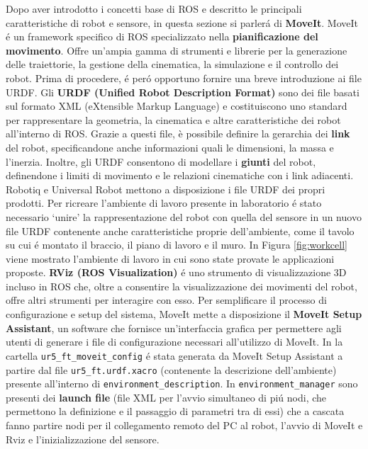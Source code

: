 Dopo aver introdotto i concetti base di ROS e descritto le principali caratteristiche di robot e sensore, in questa sezione si 
parler\'{a} di \textbf{MoveIt}. 
MoveIt \'{e} un framework specifico di ROS specializzato nella \textbf{pianificazione del movimento}. Offre un'ampia gamma 
di strumenti e librerie per la generazione delle traiettorie, la gestione della cinematica, la simulazione e il controllo 
dei robot. 
Prima di procedere, \'{e} per\'{o} opportuno fornire una breve introduzione ai file URDF.
Gli \textbf{URDF (Unified Robot Description Format)} sono dei file basati sul formato XML (eXtensible Markup Language) e 
costituiscono uno standard per rappresentare la geometria, la cinematica e altre caratteristiche dei robot all'interno di ROS. 
Grazie a questi file, è possibile definire la gerarchia dei \textbf{link} del robot, specificandone anche informazioni quali  
le dimensioni, la massa e l'inerzia. Inoltre, gli URDF consentono di modellare i \textbf{giunti}
del robot, definendone i limiti di movimento e le relazioni cinematiche con i link adiacenti. 
Robotiq e Universal Robot mettono a disposizione i file URDF dei propri prodotti. Per ricreare l'ambiente di lavoro presente in 
laboratorio \'{e} stato necessario `unire' la rappresentazione del robot con quella del sensore in un nuovo file URDF contenente 
anche caratteristiche proprie dell'ambiente, come il tavolo su cui \'{e} montato il braccio, il piano di lavoro e il muro. 
In Figura \ref{fig:workcell} viene mostrato l'ambiente di lavoro in cui sono state provate le applicazioni proposte. 
\textbf{RViz (ROS Visualization)} \'{e} uno strumento di visualizzazione 3D incluso in ROS che, oltre a consentire la visualizzazione 
dei movimenti del robot, offre altri strumenti per interagire con esso.  
Per semplificare il processo di configurazione e setup del sistema, MoveIt mette a disposizione il \textbf{MoveIt Setup Assistant},  
un software che fornisce un'interfaccia grafica per permettere agli utenti di generare i file di configurazione necessari 
all'utilizzo di MoveIt. 
In \cite{environment_setup} la cartella \verb|ur5_ft_moveit_config| \'{e} stata generata da MoveIt Setup Assistant a partire 
dal file \verb|ur5_ft.urdf.xacro| (contenente la descrizione dell'ambiente) presente all'interno di \verb|environment_description|. 
In \verb|environment_manager| sono presenti dei \textbf{launch file} (file XML per l'avvio simultaneo di pi\'{u} nodi, che 
permettono la definizione e il passaggio di parametri tra di essi) che a cascata fanno partire nodi per il collegamento remoto del 
PC al robot, l'avvio di MoveIt e Rviz e l'inizializzazione del sensore. 
